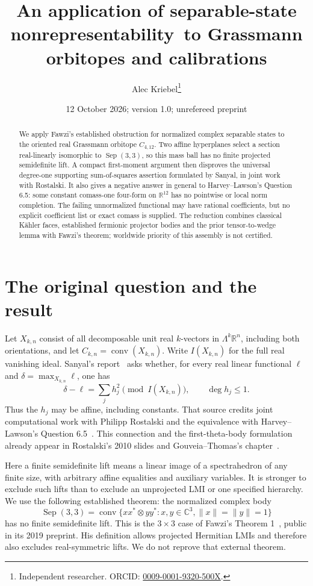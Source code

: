 \documentclass[11pt]{article}
\title{An application of separable-state nonrepresentability\ to Grassmann orbitopes and calibrations}
\author{Alec Kriebel\thanks{Independent researcher. ORCID:
\href{https://orcid.org/0009-0001-9320-500X}{0009-0001-9320-500X}.}}
\date{12 October 2026; version 1.0; unrefereed preprint}
\newcommand{\conv}{\operatorname{conv}}
\newcommand{\Sep}{\operatorname{Sep}}
\begin{document}
\maketitle
\begin{abstract}
We apply Fawzi's established obstruction for normalized complex separable
states to the oriented real Grassmann orbitope $C_{4,12}$. Two affine
hyperplanes select a section real-linearly isomorphic to $\Sep(3,3)$,
so this mass ball has no finite projected semidefinite lift. A compact
first-moment argument then disproves the universal degree-one supporting
sum-of-squares assertion formulated by Sanyal, in joint work with Rostalski.
It also gives a negative answer in general to Harvey--Lawson's Question 6.5:
some constant comass-one four-form on $\mathbb R^{12}$ has no pointwise or
local norm completion. The failing unnormalized functional may have rational
coefficients, but no explicit coefficient list or exact comass is supplied.
The reduction combines classical K\"ahler faces, established fermionic
projector bodies and the prior tensor-to-wedge lemma with Fawzi's theorem;
worldwide priority of this assembly is not certified.
\end{abstract}

\section{The original question and the result}
Let $X_{k,n}$ consist of all decomposable unit real $k$-vectors in
$\Lambda^k\mathbb R^n$, including both orientations, and let
$C_{k,n}=\conv(X_{k,n})$. Write $I(X_{k,n})$ for the full real vanishing
ideal. Sanyal's report~\cite[pp.708--709]{sanyal} asks whether, for every
real linear functional $\ell$ and $\delta=\max_{X_{k,n}}\ell$, one has
\begin{equation}\label{eq:sos}
 \delta-\ell=\sum_j h_j^2\pmod{I(X_{k,n})},\qquad \deg h_j\leq1.
\end{equation}
Thus the $h_j$ may be affine, including constants. That source credits
joint computational work with Philipp Rostalski and the equivalence with
Harvey--Lawson's Question 6.5~\cite[p.68]{hl}. This connection and the
first-theta-body formulation already appear in Rostalski's 2010 slides and
Gouveia--Thomas's chapter~\cite{rostalski,chapter}.

Here a finite semidefinite lift means a linear image of a spectrahedron of
any finite size, with arbitrary affine equalities and auxiliary variables.
It is stronger to exclude such lifts than to exclude an unprojected LMI or
one specified hierarchy. We use the following established theorem: the
normalized complex body
\[
 \Sep(3,3)=\conv\{xx^*\otimes yy^*:x,y\in\mathbb C^3,
                      \|x\|=\|y\|=1\}
\]
has no finite semidefinite lift. This is the $3\times3$ case of Fawzi's
Theorem 1~\cite[pp.1320--1321]{fawzi}, public in its 2019 preprint. His
definition allows projected Hermitian LMIs and therefore also excludes
real-symmetric lifts. We do not reprove that external theorem.
\end{document}
